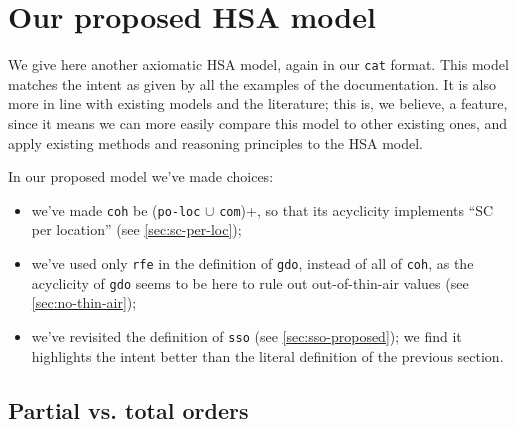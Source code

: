 \documentclass[a4paper]{article}
\begin{document}
\clearpage

\section{Our proposed HSA model \label{sec:proposed}}

We give here another axiomatic HSA model, again in our {\tt cat} format. This
model matches the intent as given by all the examples of the documentation. It
is also more in line with existing models and the literature; this is, we
believe, a feature, since it means we can more easily compare this model to
other existing ones, and apply existing methods and reasoning principles to the
HSA model.

In our proposed model we've made choices:
  \begin{itemize}
  \item we've made {\tt coh} be ({\tt po-loc} $\cup$ {\tt com})+, so that its
acyclicity implements ``SC per location'' (see \mysec\ref{sec:sc-per-loc});
  \item we've used only {\tt rfe} in the definition of {\tt gdo}, instead of
all of {\tt coh}, as the acyclicity of {\tt gdo} seems to be here to rule out
out-of-thin-air values (see \mysec\ref{sec:no-thin-air});
  \item we've revisited the definition of {\tt sso} (see
\mysec\ref{sec:sso-proposed}); we find it highlights the intent better than the
literal definition of the previous section.  \end{itemize}

\subsection{\color{blue} Partial vs. total orders \label{sec:partial-vs-total}}
\end{document}
